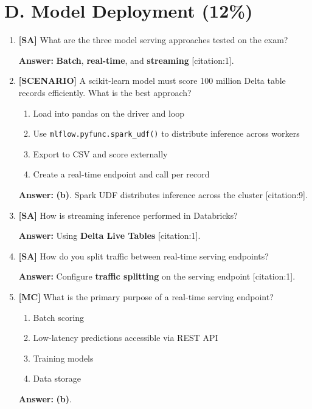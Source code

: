 \documentclass[11pt]{article}
\begin{document}
	
	\newpage
	\section{D. Model Deployment (12\%)}
	
	\begin{enumerate}[leftmargin=*, label=\textbf{Q\arabic*.}, start=33]
		
		\item \textbf{[SA]} What are the three model serving approaches tested on the exam?
		
		\textbf{Answer:} \textbf{Batch}, \textbf{real-time}, and \textbf{streaming} [citation:1].
		
		\item \textbf{[SCENARIO]} A scikit-learn model must score 100 million Delta table records efficiently. What is the best approach?
		\begin{enumerate}[label=(\alph*)]
			\item Load into pandas on the driver and loop
			\item Use \texttt{mlflow.pyfunc.spark\_udf()} to distribute inference across workers
			\item Export to CSV and score externally
			\item Create a real-time endpoint and call per record
		\end{enumerate}
		
		\textbf{Answer:} \textbf{(b)}. Spark UDF distributes inference across the cluster [citation:9].
		
		\item \textbf{[SA]} How is streaming inference performed in Databricks?
		
		\textbf{Answer:} Using \textbf{Delta Live Tables} [citation:1].
		
		\item \textbf{[SA]} How do you split traffic between real-time serving endpoints?
		
		\textbf{Answer:} Configure \textbf{traffic splitting} on the serving endpoint [citation:1].
		
		\item \textbf{[MC]} What is the primary purpose of a real-time serving endpoint?
		\begin{enumerate}[label=(\alph*)]
			\item Batch scoring
			\item Low-latency predictions accessible via REST API
			\item Training models
			\item Data storage
		\end{enumerate}
		
		\textbf{Answer:} \textbf{(b)}.
		
	\end{enumerate}
	
\end{document}
